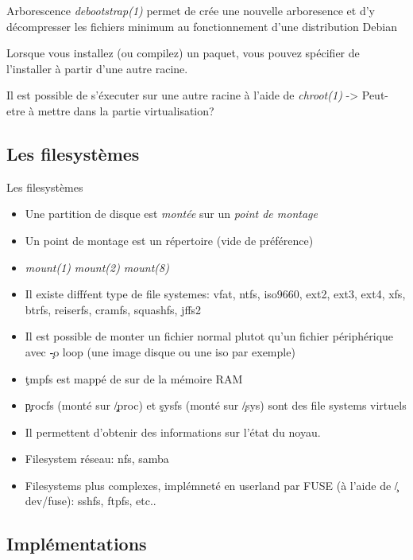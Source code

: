 \begin{frame}[fragile=singleslide]{Arborescence}
  \emph{debootstrap(1)} permet de crée une nouvelle arboresence et d'y
  décompresser   les   fichiers   minimum  au   fonctionnement   d'une
  distribution Debian

  Lorsque  vous  installez  (ou   compilez)  un  paquet,  vous  pouvez
  spécifier de l'installer à partir d'une autre racine.

  Il  est possible  de s'éxecuter  sur une  autre racine  à  l'aide de
  \emph{chroot(1)}   ->   Peut-etre    à   mettre   dans   la   partie
  virtualisation?
\end{frame}

\subsection{Les filesystèmes}

\begin{frame}[fragile=singleslide]{Les filesystèmes}
  \begin{itemize}
  \item Une  partition de disque est \emph{montée}  sur un \emph{point
      de montage}
  \item Un point de montage est un répertoire (vide de préférence)
  \item \emph{mount(1)} \emph{mount(2)} \emph{mount(8)}
  \item Il existe diffŕent type de file systemes: vfat, ntfs, iso9660,
    ext2, ext3, ext4, xfs, btrfs, reiserfs, cramfs, squashfs, jffs2
  \item  Il est  possible de  monter  un fichier  normal plutot  qu'un
    fichier périphérique avec \c{-o loop} (une image disque ou une iso
    par exemple)
  \item \c{tmpfs} est mappé de sur de la mémoire RAM
  \item  \c{procfs}  (monté sur  \c{/proc})  et  \c{sysfs} (monté  sur
    \c{/sys}) sont des file systems virtuels
  \item Il permettent d'obtenir des informations sur l'état du noyau.
  \item Filesystem réseau: nfs, samba
  \item Filesystems plus complexes, implémneté en userland par FUSE (à
    l'aide de \c{/dev/fuse}): sshfs, ftpfs, etc..
  \end{itemize}
\end{frame}

\subsection{Implémentations}

